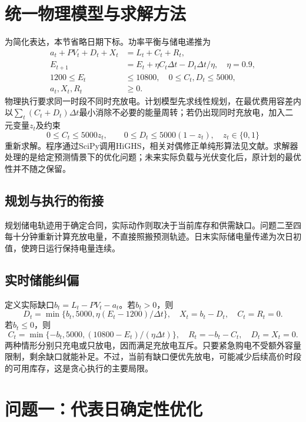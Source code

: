 \documentclass[12pt,a4paper]{ctexart}
\begin{document}
\section{统一物理模型与求解方法}
为简化表达，本节省略日期下标。功率平衡与储电递推为
\begin{align}
a_t+PV_t+D_t+X_t&=L_t+C_t+R_t,\\
E_{t+1}&=E_t+\eta C_t\Delta t-D_t\Delta t/\eta,\quad \eta=0.9,\\
1200\le E_t&\le10800,\quad 0\le C_t,D_t\le5000,\\
a_t,X_t,R_t&\ge0.
\end{align}
物理执行要求同一时段不同时充放电。计划模型先求线性规划，在最优费用容差内以$\sum_t(C_t+D_t)\Delta t$最小消除不必要的能量周转；若仍出现同时充放电，加入二元变量$z_t$及约束
\begin{equation}
0\le C_t\le5000z_t,\qquad 0\le D_t\le5000(1-z_t),\quad z_t\in\{0,1\}
\end{equation}
重新求解。程序通过SciPy调用HiGHS，相关对偶修正单纯形算法见文献\cite{simplex}。求解器处理的是给定预测情景下的优化问题；未来实际负载与光伏变化后，原计划的最优性并不随之保留。

\subsection{规划与执行的衔接}
规划储电轨迹用于确定合同，实际动作则取决于当前库存和供需缺口。问题二至四每十分钟重新计算充放电量，不直接照搬预测轨迹。日末实际储电量传递为次日初值，使跨日运行保持电量连续。

\subsection{实时储能纠偏}
定义实际缺口$b_t=L_t-PV_t-a_t$。若$b_t>0$，则
\begin{equation}
D_t=\min\{b_t,5000,\eta(E_t-1200)/\Delta t\},\quad X_t=b_t-D_t,\quad C_t=R_t=0.
\end{equation}
若$b_t\le0$，则
\begin{equation}
C_t=\min\{-b_t,5000,(10800-E_t)/(\eta\Delta t)\},\quad R_t=-b_t-C_t,\quad D_t=X_t=0.
\end{equation}
两种情形分别只充电或只放电，因而满足充放电互斥。只要紧急购电不受额外容量限制，剩余缺口就能补足。不过，当前有缺口便优先放电，可能减少后续高价时段的可用库存，这是贪心执行的主要局限。

\section{问题一：代表日确定性优化}
\end{document}
